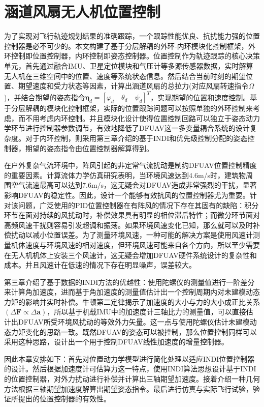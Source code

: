 \chapter{涵道风扇无人机位置控制}

为了实现对飞行轨迹规划结果的准确跟踪，一个跟踪性能优良、抗扰能力强的位置控制器是必不可少的。本文构建了基于分层解耦的外环-内环模块化控制框架，外环控制即位置控制器，内环控制即姿态控制器。位置控制作为轨迹跟踪的核心决策单元，首先通过融合IMU、卫星定位模块和气压计等多源传感器数据，实时解算无人机在三维空间中的位置、速度等系统状态信息。然后结合当前时刻的期望位置、期望速度和受力状态等因素，计算出涵道风扇的总拉力(对应风扇转速指令$\Omega$)，并结合期望的姿态指令$\boldsymbol{\eta}_d=[\varphi_d\quad \theta_d\quad \psi_d]^T$，实现期望的位置和速度控制。基于分层解耦的模块化控制框架，实际的位置跟踪问题可以按照单独的外环控制来考虑，而不用考虑内环控制。并且模块化设计使得位置控制回路可以独立于姿态动力学环节进行控制器参数调节，有效地降低了DFUAV这一多变量耦合系统的设计复杂度。对于内环控制，则采用第三章介绍的基于INDI和优先级控制分配的姿态控制器，期望的姿态指令由位置控制器解算得到。

在户外复杂气流环境中，阵风引起的非定常气流扰动是制约DFUAV位置控制精度的重要因素。计算流体力学仿真研究表明，当环境风速达到4.6m/s时，建筑物周围空气流速最高可以达到7.6m/s\cite{smeurCascadedIncrementalNonlinear2018b}，这无疑会对DFUAV造成非常强烈的干扰，显著影响DFUAV的稳定性。因此，设计一个能够有效抗风的位置控制器尤为重要。针对该问题，广泛使用的PID位置控制器在有阵风的情况下存在其固有的缺陷：积分环节在面对持续的风扰动时，补偿效果具有明显的相位滞后特性；而微分环节面对高频风速干扰则容易引发超调和振荡。如果环境风速变化已知，那么就可以及时补偿扰动以减小位置误差。为了测量环境风速，一种可能的解决方案是使用风速计测量机体速度与环境风速的相对速度，但环境风速可能来自各个方向，所以至少需要在无人机机体上安装三个风速计，这无疑会增加DFUAV硬件系统设计的复杂性和成本。并且风速计在低速的情况下存在明显噪声，误差较大。

第三章介绍了基于数据的INDI方法的优越性：使用陀螺仪的测量值进行一阶差分来计算角加速度，进而基于角加速度的测量值估计出一个控制周期内对未建模动态力矩的影响并实时补偿。牛顿第二定律揭示了加速度的大小与力的大小成正比关系$(\Delta \boldsymbol{F}\propto\Delta \boldsymbol{a})$，所以基于机载IMU中的加速度计三轴比力的测量值，可以直接估计出DFUAV所受环境风扰动的等效外力矢量。这一点与使用陀螺仪估计未建模动态力矩变化的思路一致。既然DFUAV的姿态可以被控制，那么位置控制同样可以采用这种思路，设计出一个用于控制DFUAV线性加速度的增量控制器。

因此本章安排如下：首先对位置动力学模型进行简化处理以适应INDI位置控制器的设计。然后根据加速度计可估算力这一特点，使用INDI算法思想设计基于INDI的位置控制器，对外力扰动进行补偿并计算出三轴期望加速度。接着介绍一种几何方法根据三轴期望加速度解算出期望姿态指令。最后进行仿真与实际飞行试验，验证所提出的位置控制器的有效性。

